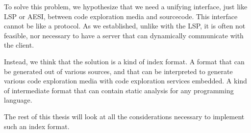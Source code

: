 To solve this problem, we hypothesize that we need a unifying interface, just like \ac{LSP} or \ac{AESI}, between code exploration media
and sourcecode.
This interface cannot be like a protocol.
As we established, unlike with the \ac{LSP}, it is often not feasible, nor necessary to have a server that can
dynamically communicate with the client.

Instead, we think that the solution is a kind of index format.
A format that can be generated out of various sources, and that can be interpreted to generate various code exploration media
with code exploration services embedded.
A kind of intermediate format that can contain static analysis for any programming language.

The rest of this thesis will look at all the considerations necessary to implement such an index format.

